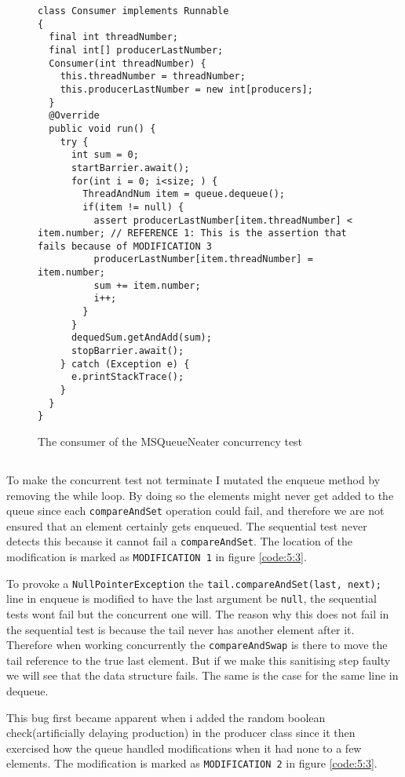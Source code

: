 \begin{figure}
\begin{lstlisting}
class Consumer implements Runnable
{
  final int threadNumber;
  final int[] producerLastNumber;
  Consumer(int threadNumber) {
    this.threadNumber = threadNumber;
    this.producerLastNumber = new int[producers];
  }
  @Override
  public void run() {
    try {
      int sum = 0;
      startBarrier.await();
      for(int i = 0; i<size; ) {
        ThreadAndNum item = queue.dequeue();
        if(item != null) {
          assert producerLastNumber[item.threadNumber] < item.number; // REFERENCE 1: This is the assertion that fails because of MODIFICATION 3
          producerLastNumber[item.threadNumber] = item.number;
          sum += item.number;
          i++;
        }
      }
      dequedSum.getAndAdd(sum);
      stopBarrier.await();
    } catch (Exception e) {
      e.printStackTrace();
    }
  }
}
\end{lstlisting}
\caption{The consumer of the MSQueueNeater concurrency test}
\label{code:5:2-3}
\end{figure}

\subsection{}
To make the concurrent test not terminate I mutated the enqueue method by removing the while loop. By doing so the elements might never get added to the queue since each \texttt{compareAndSet} operation could fail, and therefore we are not ensured that an element certainly gets enqueued. The sequential test never detects this because it cannot fail a \texttt{compareAndSet}. The location of the modification is marked as \texttt{MODIFICATION 1} in figure \ref{code:5:3}.

\newpar To provoke a \texttt{NullPointerException} the \texttt{tail.compareAndSet(last, next);} line in enqueue is modified to have the last argument be \texttt{null}, the sequential tests wont fail but the concurrent one will. The reason why this does not fail in the sequential test is because the tail never has another element after it. Therefore when working concurrently the \texttt{compareAndSwap} is there to move the tail reference to the true last element. But if we make this sanitising step faulty we will see that the data structure fails. The same is the case for the same line in dequeue. 

This bug first became apparent when i added the random boolean check(artificially delaying production) in the producer class since it then exercised how the queue handled modifications when it had none to a few elements. The modification is marked as \texttt{MODIFICATION 2} in figure \ref{code:5:3}.

